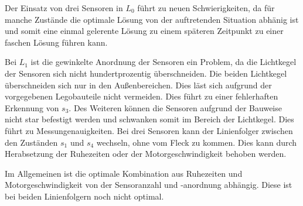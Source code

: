 Der Einsatz von drei Sensoren in $L_0$ führt zu neuen Schwierigkeiten, da für manche Zustände die optimale Lösung von der auftretenden Situation abhänig ist und somit eine einmal gelerente Lösung zu einem späteren Zeitpunkt zu einer faschen Lösung führen kann.\par
Bei $L_1$ ist die gewinkelte Anordnung der Sensoren ein Problem, da die Lichtkegel der Sensoren sich nicht hundertprozentig überschneiden. Die beiden Lichtkegel überschneiden sich nur in den Außenbereichen. Dies läst sich aufgrund der vorgegebenen Legobauteile nicht vermeiden. Dies führt zu einer fehlerhaften Erkennung von $s_3$. Des Weiteren können die Sensoren aufgrund der Bauweise nicht star befestigt werden und schwanken somit im Bereich der Lichtkegel. Dies führt zu Messungenauigkeiten. Bei drei Sensoren kann der Linienfolger zwischen den Zuständen $s_1$ und $s_4$ wechseln, ohne vom Fleck zu kommen. Dies kann durch Herabsetzung der Ruhezeiten oder der Motorgeschwindigkeit behoben werden.\par
Im Allgemeinen ist die optimale Kombination aus Ruhezeiten und Motorgeschwindigkeit von der Sensoranzahl und -anordnung abhängig. Diese ist bei beiden Linienfolgern noch nicht optimal. 

